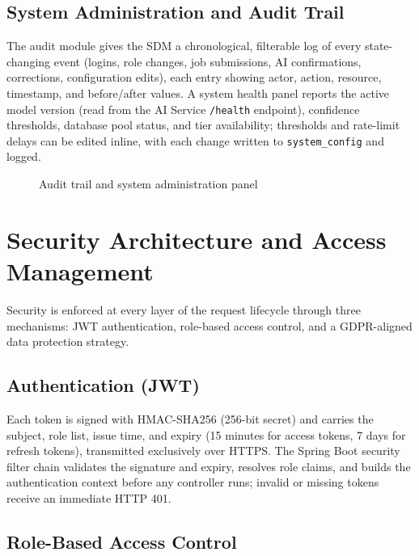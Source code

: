 \subsection{System Administration and Audit Trail}

The audit module gives the SDM a chronological, filterable log of every state-changing event (logins, role changes, job submissions, AI confirmations, corrections, configuration edits), each entry showing actor, action, resource, timestamp, and before/after values. A system health panel reports the active model version (read from the AI Service \texttt{/health} endpoint), confidence thresholds, database pool status, and tier availability; thresholds and rate-limit delays can be edited inline, with each change written to \texttt{system\_config} and logged.

\begin{figure}[H]
  \centering
  \caption{Audit trail and system administration panel}
  \label{fig:audit-screenshot}
\end{figure}

\section{Security Architecture and Access Management}

Security is enforced at every layer of the request lifecycle through three mechanisms: JWT authentication, role-based access control, and a GDPR-aligned data protection strategy.

\subsection{Authentication (JWT)}

Each token is signed with HMAC-SHA256 (256-bit secret) and carries the subject, role list, issue time, and expiry (15 minutes for access tokens, 7 days for refresh tokens), transmitted exclusively over HTTPS. The Spring Boot security filter chain validates the signature and expiry, resolves role claims, and builds the authentication context before any controller runs; invalid or missing tokens receive an immediate HTTP 401.

\subsection{Role-Based Access Control}

